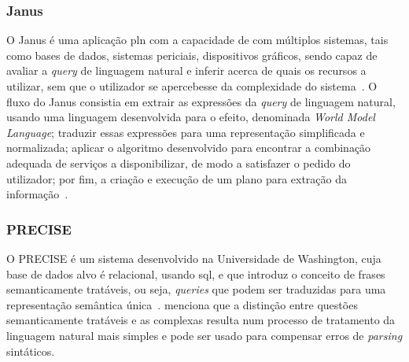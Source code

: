 \subsubsection*{Janus}
O Janus é uma aplicação \gls{pln} com a capacidade de  com múltiplos sistemas, tais como bases de dados, sistemas periciais, dispositivos gráficos, sendo capaz de avaliar a \textit{query} de linguagem natural e inferir acerca de quais os recursos a utilizar, sem que o utilizador se apercebesse da complexidade do sistema~\parencite{nlidb_brief_review, access_multiple_underlying_system_janus}. O fluxo do Janus consistia em extrair as expressões da \textit{query} de linguagem natural, usando uma linguagem desenvolvida para o efeito, denominada \textit{World Model Language}; traduzir essas expressões para uma representação simplificada e normalizada; aplicar o algoritmo desenvolvido para encontrar a combinação adequada de serviços a disponibilizar, de modo a satisfazer o pedido do utilizador; por fim, a criação e execução de um plano para extração da informação~\parencite{access_multiple_underlying_system_janus}.

\subsubsection*{PRECISE}
O PRECISE é um sistema desenvolvido na Universidade de Washington, cuja base de dados alvo é relacional, usando \gls{sql}, e que introduz o conceito de frases semanticamente tratáveis, ou seja, \textit{queries} que podem ser traduzidas para uma representação semântica única~\parencite{overview_nlidb_approaches_implementation_airline, nlidb_brief_review}. \textcite{modern_nlidb_composing_statistical_parsing_semantic_tractability} menciona que a distinção entre questões semanticamente tratáveis e as complexas resulta num processo de tratamento da linguagem natural mais simples e pode ser usado para compensar erros de \textit{parsing} sintáticos. 

